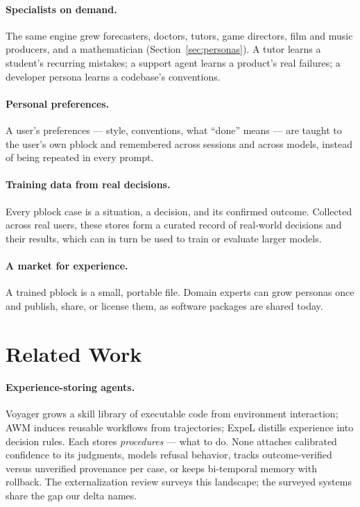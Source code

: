 \documentclass[11pt]{article}
\begin{document}
\paragraph{Specialists on demand.} The same engine grew forecasters, doctors, tutors, game directors, film and music producers, and a mathematician (Section~\ref{sec:personas}). A tutor learns a student's recurring mistakes; a support agent learns a product's real failures; a developer persona learns a codebase's conventions.

\paragraph{Personal preferences.} A user's preferences --- style, conventions, what ``done'' means --- are taught to the user's own pblock and remembered across sessions and across models, instead of being repeated in every prompt.

\paragraph{Training data from real decisions.} Every pblock case is a situation, a decision, and its confirmed outcome. Collected across real users, these stores form a curated record of real-world decisions and their results, which can in turn be used to train or evaluate larger models.

\paragraph{A market for experience.} A trained pblock is a small, portable file. Domain experts can grow personas once and publish, share, or license them, as software packages are shared today.

\section{Related Work}
\label{sec:related}

\paragraph{Experience-storing agents.} Voyager \cite{wang2023voyager} grows a skill library of executable code from environment interaction; AWM \cite{wang2025awm} induces reusable workflows from trajectories; ExpeL \cite{zhao2024expel} distills experience into decision rules. Each stores \emph{procedures} --- what to do. None attaches calibrated confidence to its judgments, models refusal behavior, tracks outcome-verified versus unverified provenance per case, or keeps bi-temporal memory with rollback. The externalization review \cite{externalization2026} surveys this landscape; the surveyed systems share the gap our delta names.
\end{document}
